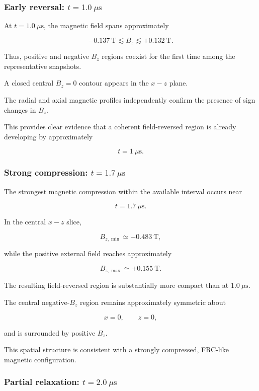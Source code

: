 \documentclass[11pt,a4paper]{article}
\begin{document}
\subsubsection{Early reversal: \(t=1.0~\mu\mathrm{s}\)}

At \(t=1.0~\mu\mathrm{s}\), the magnetic field spans approximately

\[
-0.137~\mathrm{T}
\lesssim
B_z
\lesssim
+0.132~\mathrm{T}.
\]

Thus, positive and negative \(B_z\) regions coexist for the first time among
the representative snapshots.

A closed central \(B_z=0\) contour appears in the \(x-z\) plane.

The radial and axial magnetic profiles independently confirm the presence of
sign changes in \(B_z\).

This provides clear evidence that a coherent field-reversed region is already
developing by approximately

\[
t=1~\mu\mathrm{s}.
\]


\subsubsection{Strong compression: \(t=1.7~\mu\mathrm{s}\)}

The strongest magnetic compression within the available interval occurs near

\[
t=1.7~\mu\mathrm{s}.
\]

In the central \(x-z\) slice,

\[
B_{z,\min}
\simeq
-0.483~\mathrm{T},
\]

while the positive external field reaches approximately

\[
B_{z,\max}
\simeq
+0.155~\mathrm{T}.
\]

The resulting field-reversed region is substantially more compact than at
\(1.0~\mu\mathrm{s}\).

The central negative-\(B_z\) region remains approximately symmetric about

\[
x=0,\qquad z=0,
\]

and is surrounded by positive \(B_z\).

This spatial structure is consistent with a strongly compressed,
FRC-like magnetic configuration.


\subsubsection{Partial relaxation: \(t=2.0~\mu\mathrm{s}\)}
\end{document}
